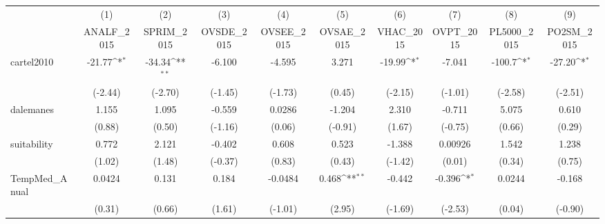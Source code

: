 {
\def\sym#1{\ifmmode^{#1}\else\(^{#1}\)\fi}
\begin{tabular}{l*{9}{c}}
\hline\hline
            &\multicolumn{1}{c}{(1)}&\multicolumn{1}{c}{(2)}&\multicolumn{1}{c}{(3)}&\multicolumn{1}{c}{(4)}&\multicolumn{1}{c}{(5)}&\multicolumn{1}{c}{(6)}&\multicolumn{1}{c}{(7)}&\multicolumn{1}{c}{(8)}&\multicolumn{1}{c}{(9)}\\
            &\multicolumn{1}{c}{ANALF\_2015}&\multicolumn{1}{c}{SPRIM\_2015}&\multicolumn{1}{c}{OVSDE\_2015}&\multicolumn{1}{c}{OVSEE\_2015}&\multicolumn{1}{c}{OVSAE\_2015}&\multicolumn{1}{c}{VHAC\_2015}&\multicolumn{1}{c}{OVPT\_2015}&\multicolumn{1}{c}{PL5000\_2015}&\multicolumn{1}{c}{PO2SM\_2015}\\
\hline
cartel2010  &      -21.77\sym{*}  &      -34.34\sym{**} &      -6.100         &      -4.595         &       3.271         &      -19.99\sym{*}  &      -7.041         &      -100.7\sym{*}  &      -27.20\sym{*}  \\
            &     (-2.44)         &     (-2.70)         &     (-1.45)         &     (-1.73)         &      (0.45)         &     (-2.15)         &     (-1.01)         &     (-2.58)         &     (-2.51)         \\
[1em]
dalemanes   &       1.155         &       1.095         &      -0.559         &      0.0286         &      -1.204         &       2.310         &      -0.711         &       5.075         &       0.610         \\
            &      (0.88)         &      (0.50)         &     (-1.16)         &      (0.06)         &     (-0.91)         &      (1.67)         &     (-0.75)         &      (0.66)         &      (0.29)         \\
[1em]
suitability &       0.772         &       2.121         &      -0.402         &       0.608         &       0.523         &      -1.388         &     0.00926         &       1.542         &       1.238         \\
            &      (1.02)         &      (1.48)         &     (-0.37)         &      (0.83)         &      (0.43)         &     (-1.42)         &      (0.01)         &      (0.34)         &      (0.75)         \\
[1em]
TempMed\_Anual&      0.0424         &       0.131         &       0.184         &     -0.0484         &       0.468\sym{**} &      -0.442         &      -0.396\sym{*}  &      0.0244         &      -0.168         \\
            &      (0.31)         &      (0.66)         &      (1.61)         &     (-1.01)         &      (2.95)         &     (-1.69)         &     (-2.53)         &      (0.04)         &     (-0.90)         \\

\end{tabular}}
